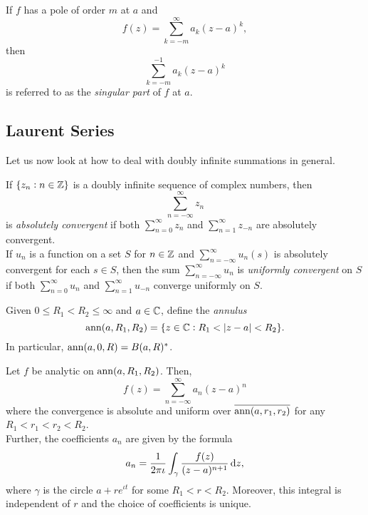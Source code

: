 		\begin{fdef}
			If $f$ has a pole of order $m$ at $a$ and
			\[ f(z) = \sum_{k=-m}^{\infty} a_{k} (z-a)^k, \]
			then
			\[ \sum_{k=-m}^{-1} a_k (z-a)^k \]
			is referred to as the \emph{singular part} of $f$ at $a$.
		\end{fdef}

	\subsection{Laurent Series}

		Let us now look at how to deal with doubly infinite summations in general.

		\begin{definition}
			If $\{ z_n : n \in \mathbb{Z} \}$ is a doubly infinite sequence of complex numbers, then
			\[ \sum_{n=-\infty}^{\infty} z_n \]
			is \emph{absolutely convergent} if both $\sum_{n=0}^\infty z_n$ and $\sum_{n=1}^\infty z_{-n}$ are absolutely convergent. \\
			If $u_n$ is a function on a set $S$ for $n \in \mathbb{Z}$ and $\sum_{n=-\infty}^{\infty} u_n(s)$ is absolutely convergent for each $s \in S$, then the sum $\sum_{n=-\infty}^{\infty} u_n$ is \emph{uniformly convergent} on $S$ if both $\sum_{n=0}^{\infty} u_n$ and $\sum_{n=1}^{\infty} u_{-n}$ converge uniformly on $S$.
		\end{definition}
		
		Given $0 \le R_1 < R_2 \le \infty$ and $a \in \mathbb{C}$, define the \emph{annulus}
		\[ \operatorname{ann}(a,R_1,R_2) = \{ z \in \mathbb{C} : R_1 < |z-a| < R_2 \}. \]
		In particular, $\operatorname{ann}(a,0,R) = B(a,R)^*$.

		\begin{ftheo}
			Let $f$ be analytic on $\operatorname{ann}(a,R_1,R_2)$. Then,
			\[ f(z) = \sum_{n=-\infty}^{\infty} a_n (z-a)^n \]
			where the convergence is absolute and uniform over $\overline{\operatorname{ann}(a,r_1,r_2)}$ for any $R_1 < r_1 < r_2 < R_2$.\\
			Further, the coefficients $a_n$ are given by the formula
			\[ a_n = \frac{1}{2\pi\iota} \int_{\gamma} \frac{f(z)}{(z-a)^{n+1}} \dif z, \]
			where $\gamma$ is the circle $a+re^{\iota t}$ for some $R_1 < r < R_2$. Moreover, this integral is independent of $r$ and the choice of coefficients is unique.
		\end{ftheo}

